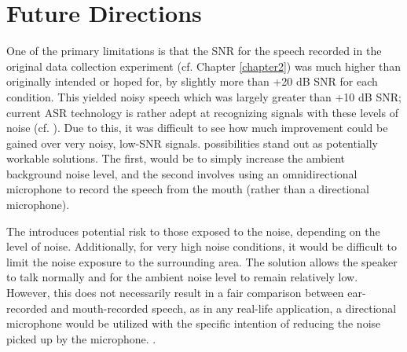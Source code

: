 \DIFaddend \section{Future Directions}\label{chap5:future-research}

One of the primary limitations \DIFdelbegin {}\DIFdelend is that the SNR for the speech recorded in the original data collection experiment (cf. Chapter \ref{chapter2}) was much higher than originally intended or hoped for, by slightly more than +20 dB SNR for each condition.  This yielded noisy speech which was largely greater than +10 dB SNR; current ASR technology is rather adept at recognizing signals with these levels of noise (cf. \cite{braun:16}).  Due to this, it was difficult to see how much improvement could be gained over very noisy, low-SNR signals.  \DIFdelbegin {}\DIFdelend \DIFaddbegin {}\DIFaddend possibilities stand out as potentially workable solutions.  The first, would be to simply increase the ambient background noise level, and the second involves using an omnidirectional microphone to record the speech from the mouth (rather than a directional microphone).  \DIFaddbegin {}\DIFaddend 

The \DIFdelbegin {}\DIFdelend \DIFaddbegin {}\DIFaddend introduces potential risk to those exposed to the noise, depending on the level of noise\DIFdelbegin {}\DIFdelend \DIFaddbegin {}\DIFaddend .  Additionally, for very high noise conditions, it would be difficult to limit the noise exposure to the surrounding area.  The \DIFdelbegin {}\DIFdelend \DIFaddbegin {}\DIFaddend solution allows the speaker to talk normally and for the ambient noise level to remain relatively low.  However, this does not necessarily result in a fair comparison between ear-recorded and mouth-recorded speech, as in any real-life application, a directional microphone would be utilized with the specific intention of reducing the noise picked up by the microphone.  \DIFdelbegin {}\DIFdelend %
\DIFaddbegin {}\DIFaddend .

